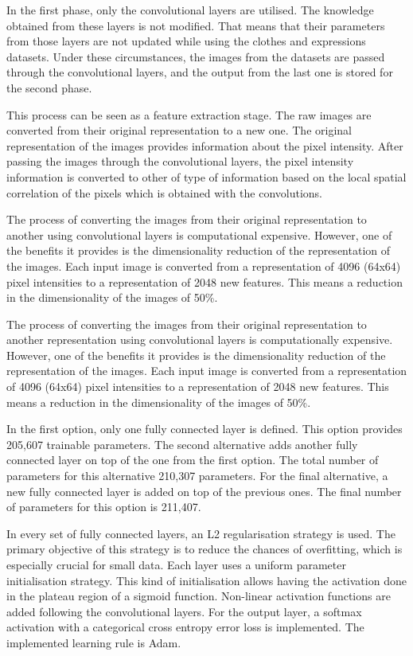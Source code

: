 \documentclass{article}
\begin{document}
In the first phase, only the convolutional layers are utilised. The knowledge obtained from these layers is not modified. That means that their parameters from those layers are not updated while using the clothes and expressions datasets. Under these circumstances, the images from the datasets are passed through the convolutional layers, and the output from the last one is stored for the second phase.

This process can be seen as a feature extraction stage. The raw images are converted from their original representation to a new one. The original representation of the images provides information about the pixel intensity. After passing the images through the convolutional layers, the pixel intensity information is converted to other of type of information based on the local spatial correlation of the pixels which is obtained with the convolutions.

The process of converting the images from their original representation to another using convolutional layers is computational expensive. However, one of the benefits it provides is the dimensionality reduction of the representation of the images. Each input image is converted from a representation of 4096 (64x64) pixel intensities to a representation of 2048 new features. This means a reduction in the dimensionality of the images of 50\%.

The process of converting the images from their original representation to another representation using convolutional layers is computationally expensive. However, one of the benefits it provides is the dimensionality reduction of the representation of the images. Each input image is converted from a representation of 4096 (64x64) pixel intensities to a representation of 2048 new features. This means a reduction in the dimensionality of the images of 50\%.

In the first option, only one fully connected layer is defined. This option provides 205,607 trainable parameters. The second alternative adds another fully connected layer on top of the one from the first option. The total number of parameters for this alternative 210,307 parameters. For the final alternative, a new fully connected layer is added on top of the previous ones. The final number of parameters for this option is 211,407.

In every set of fully connected layers, an L2 regularisation strategy is used. The primary objective of this strategy is to reduce the chances of overfitting, which is especially crucial for small data. Each layer uses a uniform parameter initialisation strategy. This kind of initialisation allows having the activation done in the plateau region of a sigmoid function. Non-linear activation functions are added following the convolutional layers. For the output layer, a softmax activation with a categorical cross entropy error loss is implemented. The implemented learning rule is Adam.
\end{document}
